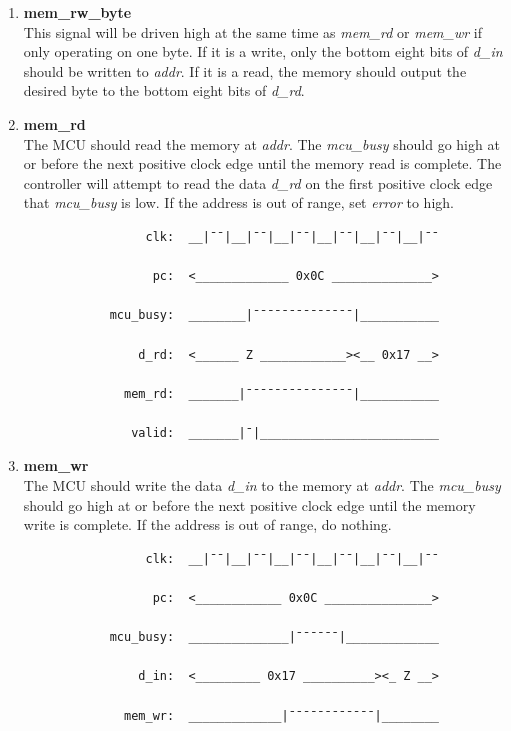 \documentclass[10pt,a4paper]{article}
\begin{document}
\begin{enumerate}
    \item\textbf{mem\_rw\_byte}\\
    This signal will be driven high at the same time as \emph{mem\_rd} or \emph{mem\_wr} if only
    operating on one byte. If it is a write, only the bottom eight bits of \emph{d\_in} should be
    written to \emph{addr}. If it is a read, the memory should output the desired byte to the
    bottom eight bits of \emph{d\_rd}.

    \newpage
    \item\textbf{mem\_rd}\\
    The MCU should read the memory at \emph{addr}. The \emph{mcu\_busy} should go
     high at or before the next positive clock edge until the memory read is complete. The
    controller will attempt to read the data \emph{d\_rd} on the first positive clock edge that
    \emph{mcu\_busy} is low. If the address is out of range, set \emph{error} to high.

        \begin{verbatim}
                 clk:  __|¯¯|__|¯¯|__|¯¯|__|¯¯|__|¯¯|__|¯¯

                  pc:  <_____________ 0x0C ______________>

            mcu_busy:  ________|¯¯¯¯¯¯¯¯¯¯¯¯¯¯|___________

                d_rd:  <______ Z ____________><__ 0x17 __>

              mem_rd:  _______|¯¯¯¯¯¯¯¯¯¯¯¯¯¯¯|___________

               valid:  _______|¯|_________________________
        \end{verbatim}

    \item\textbf{mem\_wr}\\
    The MCU should write the data \emph{d\_in} to the memory at \emph{addr}. The \emph{mcu\_busy} should go
    high at or before the next positive clock edge until the memory write is complete.
    If the address is out of range, do nothing.

        \begin{verbatim}
                 clk:  __|¯¯|__|¯¯|__|¯¯|__|¯¯|__|¯¯|__|¯¯

                  pc:  <____________ 0x0C _______________>

            mcu_busy:  ______________|¯¯¯¯¯¯|_____________

                d_in:  <_________ 0x17 __________><_ Z __>

              mem_wr:  _____________|¯¯¯¯¯¯¯¯¯¯¯¯|________


\end{verbatim}
\end{enumerate}
\end{document}
